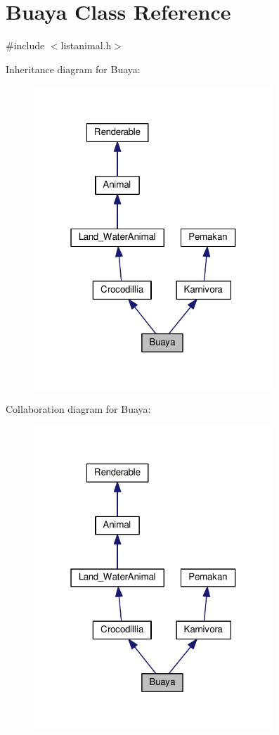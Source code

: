\hypertarget{classBuaya}{}\section{Buaya Class Reference}
\label{classBuaya}


{\ttfamily \#include $<$listanimal.\+h$>$}



Inheritance diagram for Buaya\+:
\nopagebreak
\begin{figure}[H]
\begin{center}
\leavevmode
\includegraphics[width=256pt]{classBuaya__inherit__graph}
\end{center}
\end{figure}


Collaboration diagram for Buaya\+:
\nopagebreak
\begin{figure}[H]
\begin{center}
\leavevmode
\includegraphics[width=256pt]{classBuaya__coll__graph}
\end{center}
\end{figure}
